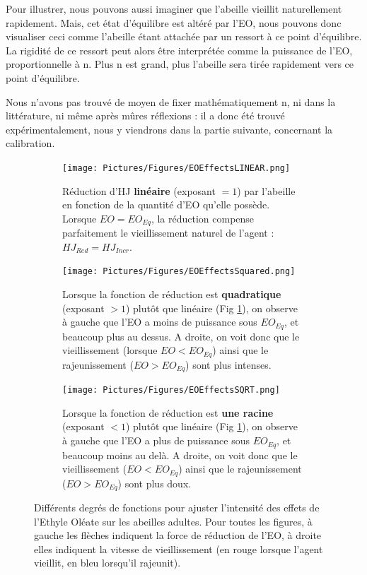 	Pour illustrer, nous pouvons aussi imaginer que l'abeille vieillit naturellement rapidement. Mais, cet état d'équilibre est altéré par l'EO, nous pouvons donc visualiser ceci comme l'abeille étant attachée par un ressort à ce point d'équilibre. La rigidité de ce ressort peut alors être interprétée comme la puissance de l'EO, proportionnelle à n. Plus n est grand, plus l'abeille sera tirée rapidement vers ce point d'équilibre.
	
	Nous n'avons pas trouvé de moyen de fixer mathématiquement n, ni dans la littérature, ni même après mûres réflexions : il a donc été trouvé expérimentalement, nous y viendrons dans la partie suivante, concernant la calibration.
	
	\begin{figure}
	\centering
	
	\begin{subfigure}{\textwidth}
	\centering
	\texttt{[image: Pictures/Figures/EOEffectsLINEAR.png]}
	\caption{Réduction d'HJ \textbf{linéaire} (exposant $= 1$) par l'abeille en fonction de la quantité d'EO qu'elle possède. Lorsque $EO = EO_{Eq}$, la réduction compense parfaitement le vieillissement naturel de l'agent : $HJ_{Red} = HJ_{Incr}$.}
	\label{eoLinear}
	\end{subfigure}
	
	\begin{subfigure}{\textwidth}
	\centering
	\texttt{[image: Pictures/Figures/EOEffectsSquared.png]}
	\caption{Lorsque la fonction de réduction est \textbf{quadratique} (exposant $> 1$) plutôt que linéaire (Fig \ref{eoLinear}), on observe à gauche que l'EO a moins de puissance sous $EO_{Eq}$, et beaucoup plus au dessus. A droite, on voit donc que le vieillissement (lorsque $EO < EO_{Eq}$) ainsi que le rajeunissement ($EO > EO_{Eq}$) sont plus intenses.}
	\label{eoSquared}
	\end{subfigure}
	
	\begin{subfigure}{\textwidth}
	\centering
	\texttt{[image: Pictures/Figures/EOEffectsSQRT.png]}
	\caption{Lorsque la fonction de réduction est \textbf{une racine} (exposant $< 1$) plutôt que linéaire (Fig \ref{eoLinear}), on observe à gauche que l'EO a plus de puissance sous $EO_{Eq}$, et beaucoup moins au delà. A droite, on voit donc que le vieillissement ($EO < EO_{Eq}$) ainsi que le rajeunissement ($EO > EO_{Eq}$) sont plus doux.}
	\label{eoSqrt}	
	\end{subfigure}
	
	\caption[Différents degrés de fonctions pour ajuster l'intensité des effets de l'Ethyle Oléate sur les abeilles adultes.]{Différents degrés de fonctions pour ajuster l'intensité des effets de l'Ethyle Oléate sur les abeilles adultes. Pour toutes les figures, à gauche les flèches indiquent la force de réduction de l'EO, à droite elles indiquent la vitesse de vieillissement (en rouge lorsque l'agent vieillit, en bleu lorsqu'il rajeunit).}	
	\label{eoAll}
	\end{figure}
	
